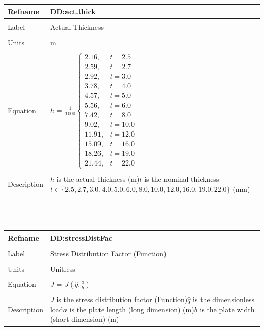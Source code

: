 \documentclass[12pt]{article}
\begin{document}
\noindent \begin{minipage}{\textwidth}
\begin{tabular}{p{} p{}}
\toprule \textbf{Refname} & \textbf{DD:act.thick}
\label{DD:act.thick}
\\ \midrule \\
Label & Actual Thickness
\\ \midrule \\
Units & m
\\ \midrule \\
Equation & $h$ = $\frac{1}{1000} \begin{cases}
2.16, & t=2.5\\
2.59, & t=2.7\\
2.92, & t=3.0\\
3.78, & t=4.0\\
4.57, & t=5.0\\
5.56, & t=6.0\\
7.42, & t=8.0\\
9.02, & t=10.0\\
11.91, & t=12.0\\
15.09, & t=16.0\\
18.26, & t=19.0\\
21.44, & t=22.0
\end{cases}$
\\ \midrule \\
Description & $h$ is the actual thickness (m)\newline$t$ is the nominal thickness $t\in{}\{2.5, 2.7, 3.0, 4.0, 5.0, 6.0, 8.0, 10.0, 12.0, 16.0, 19.0, 22.0\}$ (mm)
\\ \bottomrule \end{tabular}
\end{minipage}\\
~\newline
\noindent \begin{minipage}{\textwidth}
\begin{tabular}{p{} p{}}
\toprule \textbf{Refname} & \textbf{DD:stressDistFac}
\label{DD:stressDistFac}
\\ \midrule \\
Label & Stress Distribution Factor (Function)
\\ \midrule \\
Units & Unitless
\\ \midrule \\
Equation & $J$ = $J\left(\hat{q},\frac{a}{b}\right)$
\\ \midrule \\
Description & $J$ is the stress distribution factor (Function)\newline$\hat{q}$ is the dimensionless load\newline$a$ is the plate length (long dimension) (m)\newline$b$ is the plate width (short dimension) (m)
\\ \bottomrule \end{tabular}
\end{minipage}\\
\end{document}
